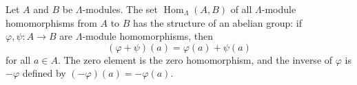 Let $A$ and $B$ be $\Lambda$-modules. The set $\operatorname{Hom}_\Lambda(A, B)$ of all $\Lambda$-module homomorphisms from $A$ to $B$ has the structure of an abelian group: if $\varphi, \psi : A \to B$ are $\Lambda$-module homomorphisms, then
$$(\varphi + \psi)(a) = \varphi(a) + \psi(a)$$
for all $a \in A$. The zero element is the zero homomorphism, and the inverse of $\varphi$ is $-\varphi$ defined by $(-\varphi)(a) = -\varphi(a)$.